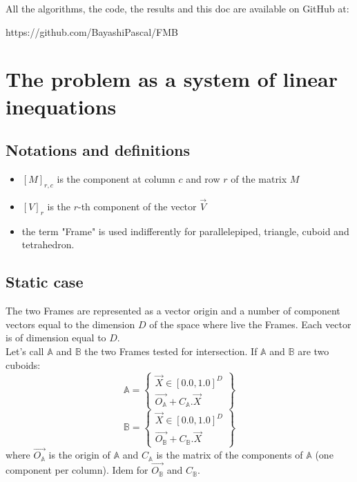 \documentclass[12pt, a4paper]{article}
\begin{document}
All the algorithms, the code, the results and this doc are available on GitHub at:
\begin{center}
https://github.com/BayashiPascal/FMB
 \end{center}
 
\section{The problem as a system of linear inequations}

\subsection{Notations and definitions}

\begin{itemize}
\item{$\left[M\right]_{r,c}$ is the component at column $c$ and row $r$ of the matrix $M$}
\item{$\left[V\right]_r$ is the $r$-th component of the vector $\overrightarrow{V}$}
\item the term "Frame" is used indifferently for parallelepiped, triangle, cuboid and tetrahedron.
\end{itemize}

\subsection{Static case}

The two Frames are represented as a vector origin and a number of component vectors equal to the dimension $D$ of the space where live the Frames. Each vector is of dimension equal to $D$.\\

Let's call $\mathbb{A}$ and $\mathbb{B}$ the two Frames tested for intersection. If $\mathbb{A}$ and $\mathbb{B}$ are two cuboids:
\begin{equation}
\mathbb{A}=\left\lbrace
\begin{array}{c}
\overrightarrow{X}\in[0.0,1.0]^D\\
\overrightarrow{O_\mathbb{A}}+C_\mathbb{A}.\overrightarrow{X}
\end{array}
\right\rbrace
\end{equation}
\begin{equation}
\mathbb{B}=\left\lbrace
\begin{array}{c}
\overrightarrow{X}\in[0.0,1.0]^D\\
\overrightarrow{O_\mathbb{B}}+C_\mathbb{B}.\overrightarrow{X}
\end{array}
\right\rbrace
\end{equation}
where $\overrightarrow{O_\mathbb{A}}$ is the origin of $\mathbb{A}$ and $C_\mathbb{A}$ is the matrix of the components of $\mathbb{A}$ (one component per column). Idem for $\overrightarrow{O_\mathbb{B}}$ and $C_\mathbb{B}$.\\
\end{document}
